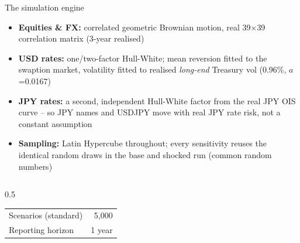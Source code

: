 \documentclass[9pt,aspectratio=169]{beamer}
\begin{document}
\begin{frame}{The simulation engine}
  \begin{itemize}
    \item \textbf{Equities \& FX:} correlated geometric Brownian motion, real 39$\times$39 correlation matrix (3-year realised)
    \item \textbf{USD rates:} one/two-factor Hull-White; mean reversion fitted to the swaption market, volatility fitted to realised \emph{long-end} Treasury vol (0.96\%, $a$=0.0167)
    \item \textbf{JPY rates:} a second, independent Hull-White factor from the real JPY OIS curve -- so JPY names and USDJPY move with real JPY rate risk, not a constant assumption
    \item \textbf{Sampling:} Latin Hypercube throughout; every sensitivity reuses the identical random draws in the base and shocked run (common random numbers)
  \end{itemize}
  \vspace{10pt}
  \begin{columns}[T]
    \begin{column}{0.5\textwidth}
      \centering \small
      \begin{tabular}{lr}
        \toprule
        Scenarios (standard) & 5,000 \\
        Reporting horizon & 1 year \\
        \bottomrule
      \end{tabular}
    \end{column}
  \end{columns}
\end{frame}
\end{document}
